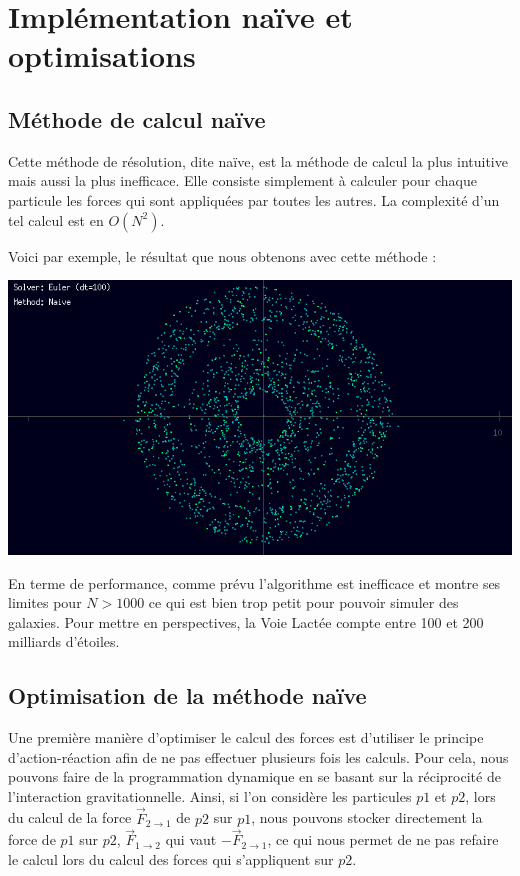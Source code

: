\chapter{Implémentation naïve et optimisations}

\section{Méthode de calcul naïve}

Cette méthode de résolution, dite naïve, est la méthode de calcul la plus intuitive mais aussi la plus inefficace. Elle consiste simplement à calculer pour chaque particule les forces qui sont appliquées par toutes les autres. La complexité d'un tel calcul est en $O(N^2)$.

Voici par exemple, le résultat que nous obtenons avec cette méthode :

\begin{center}
\includegraphics[scale=0.8]{images/naive.png}
\captionsetup{hypcap=false}
\label{fig2}
\end{center}

En terme de performance, comme prévu l'algorithme est inefficace et montre ses limites pour $N>1000$ ce qui est bien trop petit pour pouvoir simuler des galaxies. Pour mettre en perspectives, la Voie Lactée compte entre 100 et 200 milliards d'étoiles.

\section{Optimisation de la méthode naïve}
\vspace{2mm}

Une première manière d'optimiser le calcul des forces est d'utiliser le principe d'action-réaction afin de ne pas effectuer plusieurs fois les calculs.
Pour cela, nous pouvons faire de la programmation dynamique en se basant sur la réciprocité de l'interaction gravitationnelle. Ainsi, si l'on considère les particules $p1$ et $p2$, lors du calcul de la force $\vec{F}_{2 \rightarrow 1}$ de $p2$ sur $p1$, nous pouvons stocker directement la force de $p1$ sur $p2$, $\vec{F}_{1 \rightarrow 2}$ qui vaut $-\vec{F}_{2 \rightarrow 1}$, ce qui nous permet de ne pas refaire le calcul lors du calcul des forces qui s'appliquent sur $p2$.

